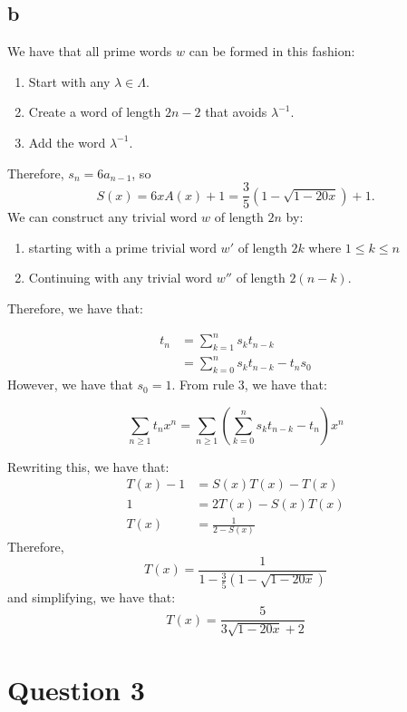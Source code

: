 \documentclass[]{article}
\begin{document}
\subsection*{b}
We have that all prime words $w$ can be formed in this fashion:
\begin{enumerate}
	\item Start with any $\lambda \in \Lambda$.
	\item Create a word of length $2n - 2$ that avoids $\lambda^{-1}$.
	\item Add the word $\lambda^{-1}$.
\end{enumerate}
Therefore, $s_n = 6 a_{n-1}$, so
\begin{equation}
	S(x) = 6x A(x) + 1 = \frac{3}{5}(1 - \sqrt{1 - 20x}) + 1.
\end{equation}
We can construct any trivial word $w$ of length $2n$ by:
\begin{enumerate}
	\item starting with a prime trivial word $w'$ of length $2k$ where $1 \leq k \leq n$
	\item Continuing with any trivial word $w''$ of length $2(n - k)$.
\end{enumerate}
Therefore, we have that:

\begin{align*}
	t_n &= \sum_{k = 1}^n s_k t_{n-k}\\
		&= \sum_{k = 0}^{n} s_k t_{n-k} - t_ns_0
\end{align*}
However, we have that $s_0 = 1$. From rule 3, we have that:

\begin{equation}
	\sum_{n \geq 1} t_n x^n= \sum_{n \geq 1} \left( \sum_{k = 0}^{n} s_k t_{n-k} - t_n\right)  x^n
\end{equation}

Rewriting this, we have that:
\begin{align*}
	T(x) - 1 &= S(x)T(x) - T(x)\\ 
	1 &= 2T(x) - S(x) T(x)\\
	T(x) &= \frac{1}{2 - S(x)}
\end{align*}
Therefore,
\begin{equation}
	T(x) = \frac{1}{1- \frac{3}{5}\left(1 - \sqrt{1 - 20x}\right)}
\end{equation}
and simplifying, we have that:
\begin{equation}
	T(x) = \frac{5}{3\sqrt{1 - 20x} + 2}
\end{equation}
\newpage
\section{Question 3}
\end{document}
